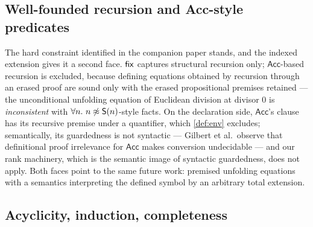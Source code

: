 \subsection{Well-founded recursion and \textsf{Acc}-style predicates}
\label{sec:limitations-wf}

The hard constraint identified in the companion paper stands, and the
indexed extension gives it a second face.  $\mathsf{fix}$ captures structural
recursion only; $\mathsf{Acc}$-based recursion is excluded, because
defining equations obtained by recursion through an erased proof are
sound only with the erased propositional premises retained --- the
unconditional unfolding equation of Euclidean division at divisor $0$
is \emph{inconsistent} with $\forall n.\ n \not\approx \mathsf{S}(n)$-style
facts.  On the declaration side, $\mathsf{Acc}$'s clause has its
recursive premise under a quantifier, which \cref{def:env} excludes;
semantically, its guardedness is not syntactic --- Gilbert et al.\
observe that definitional proof irrelevance for $\mathsf{Acc}$ makes
conversion undecidable \cite{GilbertEtAl2019} --- and our rank
machinery, which is the semantic image of syntactic guardedness, does
not apply.  Both faces point to the same future work: premised
unfolding equations with a semantics interpreting the defined symbol by
an arbitrary total extension.

\subsection{Acyclicity, induction, completeness}
\label{sec:limitations-completeness}

